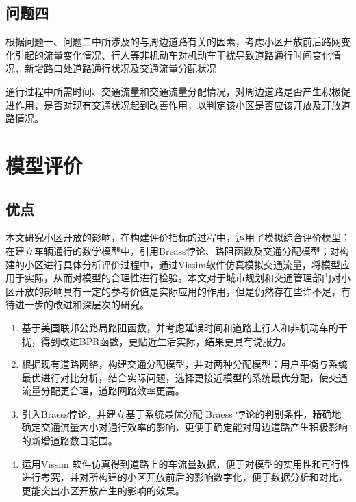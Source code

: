 \documentclass[fontset=fandol,a4paper,12pt]{ctexart}
\begin{document}
	\subsection{问题四}
		  根据问题一、问题二中所涉及的与周边道路有关的因素，考虑小区开放前后路网变化引起的流量变化情况、行人等非机动车对机动车干扰导致道路通行时间变化情况、新增路口处道路通行状况及交通流量分配状况

		通行过程中所需时间、交通流量和交通流量分配情况，对周边道路是否产生积极促进作用，是否对现有交通状况起到改善作用，以判定该小区是否应该开放及开放道路情况。
		
  \section{模型评价}
	  \subsection{优点}
		  本文研究小区开放的影响，在构建评价指标的过程中，运用了模拟综合评价模型；在建立车辆通行的数学模型中，引用Breass悖论、路阻函数及交通分配模型；对构建的小区进行具体分析评价过程中，通过Vissim软件仿真模拟交通流量，将模型应用于实际，从而对模型的合理性进行检验。本文对于城市规划和交通管理部门对小区开放的影响具有一定的参考价值是实际应用的作用，但是仍然存在些许不足，有待进一步的改进和深层次的研究。
		  \begin{enumerate}
		  	\item 基于美国联邦公路局路阻函数，并考虑延误时间和道路上行人和非机动车的干扰，得到改进BPR函数，更贴近生活实际，结果更具有说服力。
		  	\item 根据现有道路网络，构建交通分配模型，并对两种分配模型：用户平衡与系统最优进行对比分析，结合实际问题，选择更接近模型的系统最优分配，使交通流量分配更合理，道路网路效率更高。
		  	\item 引入Braess悖论，并建立基于系统最优分配 Braess 悖论的判别条件，精确地确定交通流量大小对通行效率的影响，更便于确定能对周边道路产生积极影响的新增道路数目范围。
		  	\item 运用Vissim 软件仿真得到道路上的车流量数据，便于对模型的实用性和可行性进行考究，并对所构建的小区开放前后的影响数字化，便于数据分析和对比，更能突出小区开放产生的影响的效果。
		  \end{enumerate}
\end{document}
